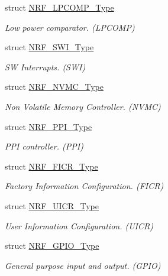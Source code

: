 \begin{DoxyCompactItemize}
struct \hyperlink{struct_n_r_f___l_p_c_o_m_p___type}{N\+R\+F\+\_\+\+L\+P\+C\+O\+M\+P\+\_\+\+Type}
\begin{DoxyCompactList}\small\item\em Low power comparator. (L\+P\+C\+O\+M\+P) \end{DoxyCompactList}\item 
struct \hyperlink{struct_n_r_f___s_w_i___type}{N\+R\+F\+\_\+\+S\+W\+I\+\_\+\+Type}
\begin{DoxyCompactList}\small\item\em S\+W Interrupts. (S\+W\+I) \end{DoxyCompactList}\item 
struct \hyperlink{struct_n_r_f___n_v_m_c___type}{N\+R\+F\+\_\+\+N\+V\+M\+C\+\_\+\+Type}
\begin{DoxyCompactList}\small\item\em Non Volatile Memory Controller. (N\+V\+M\+C) \end{DoxyCompactList}\item 
struct \hyperlink{struct_n_r_f___p_p_i___type}{N\+R\+F\+\_\+\+P\+P\+I\+\_\+\+Type}
\begin{DoxyCompactList}\small\item\em P\+P\+I controller. (P\+P\+I) \end{DoxyCompactList}\item 
struct \hyperlink{struct_n_r_f___f_i_c_r___type}{N\+R\+F\+\_\+\+F\+I\+C\+R\+\_\+\+Type}
\begin{DoxyCompactList}\small\item\em Factory Information Configuration. (F\+I\+C\+R) \end{DoxyCompactList}\item 
struct \hyperlink{struct_n_r_f___u_i_c_r___type}{N\+R\+F\+\_\+\+U\+I\+C\+R\+\_\+\+Type}
\begin{DoxyCompactList}\small\item\em User Information Configuration. (U\+I\+C\+R) \end{DoxyCompactList}\item 
struct \hyperlink{struct_n_r_f___g_p_i_o___type}{N\+R\+F\+\_\+\+G\+P\+I\+O\+\_\+\+Type}
\begin{DoxyCompactList}\small\item\em General purpose input and output. (G\+P\+I\+O) \end{DoxyCompactList}\end{DoxyCompactItemize}
